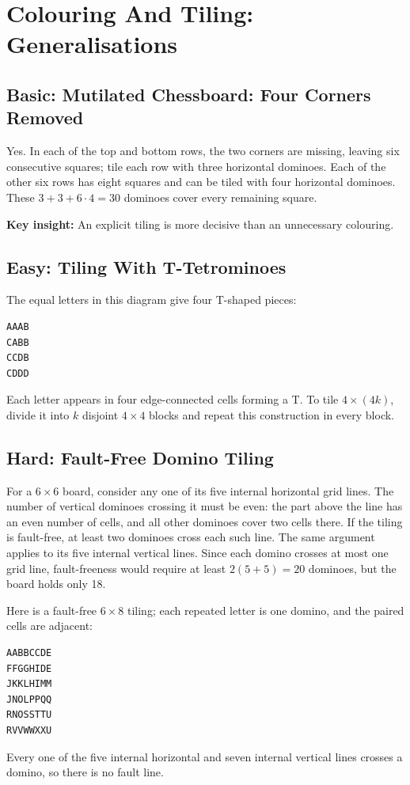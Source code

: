 \documentclass[12pt]{article}
\newcommand{\insight}[1]{\par\medskip\noindent\textbf{Key insight:} #1}
\begin{document}
\section{Colouring And Tiling: Generalisations}

\subsection*{Basic: Mutilated Chessboard: Four Corners Removed}
Yes. In each of the top and bottom rows, the two corners are missing,
leaving six consecutive squares; tile each row with three horizontal
dominoes. Each of the other six rows has eight squares and can be
tiled with four horizontal dominoes. These $3+3+6\cdot4=30$ dominoes
cover every remaining square.
\insight{An explicit tiling is more decisive than an unnecessary colouring.}

\subsection*{Easy: Tiling With T-Tetrominoes}
The equal letters in this diagram give four T-shaped pieces:
\begin{center}
\begin{verbatim}
AAAB
CABB
CCDB
CDDD
\end{verbatim}
\end{center}
Each letter appears in four edge-connected cells forming a T. To
tile $4\times(4k)$, divide it into $k$ disjoint $4\times4$ blocks and
repeat this construction in every block.

\subsection*{Hard: Fault-Free Domino Tiling}
For a $6\times6$ board, consider any one of its five internal
horizontal grid lines. The number of vertical dominoes crossing it
must be even: the part above the line has an even number of cells,
and all other dominoes cover two cells there. If the tiling is
fault-free, at least two dominoes cross each such line. The same
argument applies to its five internal vertical lines. Since each
domino crosses at most one grid line, fault-freeness would require
at least $2(5+5)=20$ dominoes, but the board holds only 18.

Here is a fault-free $6\times8$ tiling; each repeated letter is one
domino, and the paired cells are adjacent:
\begin{center}
\begin{verbatim}
AABBCCDE
FFGGHIDE
JKKLHIMM
JNOLPPQQ
RNOSSTTU
RVVWWXXU
\end{verbatim}
\end{center}
Every one of the five internal horizontal and seven internal vertical
lines crosses a domino, so there is no fault line.
\end{document}
